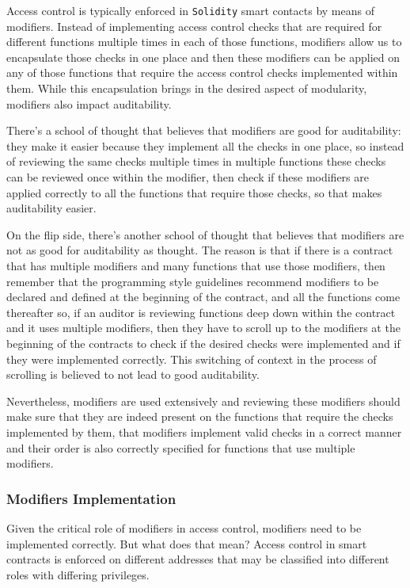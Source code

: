 Access control is typically enforced in \texttt{Solidity} smart contacts
by means of modifiers. Instead of implementing access control checks
that are required for different functions multiple times in each of
those functions, modifiers allow us to encapsulate those checks in one
place and then these modifiers can be applied on any of those functions
that require the access control checks implemented within them. While
this encapsulation brings in the desired aspect of modularity, modifiers
also impact auditability.

There's a school of thought that believes that modifiers are good for
auditability: they make it easier because they implement all the checks
in one place, so instead of reviewing the same checks multiple times in
multiple functions these checks can be reviewed once within the
modifier, then check if these modifiers are applied correctly to all the
functions that require those checks, so that makes auditability easier.

On the flip side, there's another school of thought that believes that
modifiers are not as good for auditability as thought. The reason is
that if there is a contract that has multiple modifiers and many
functions that use those modifiers, then remember that the programming
style guidelines recommend modifiers to be declared and defined at the
beginning of the contract, and all the functions come thereafter so, if
an auditor is reviewing functions deep down within the contract and it
uses multiple modifiers, then they have to scroll up to the modifiers at
the beginning of the contracts to check if the desired checks were
implemented and if they were implemented correctly. This switching of
context in the process of scrolling is believed to not lead to good
auditability.

Nevertheless, modifiers are used extensively and reviewing these
modifiers should make sure that they are indeed present on the functions
that require the checks implemented by them, that modifiers implement
valid checks in a correct manner and their order is also correctly
specified for functions that use multiple modifiers.

\subsubsection{Modifiers Implementation}\label{modifiers-implementation}

Given the critical role of modifiers in access control, modifiers need
to be implemented correctly. But what does that mean? Access control in
smart contracts is enforced on different addresses that may be
classified into different roles with differing privileges.

